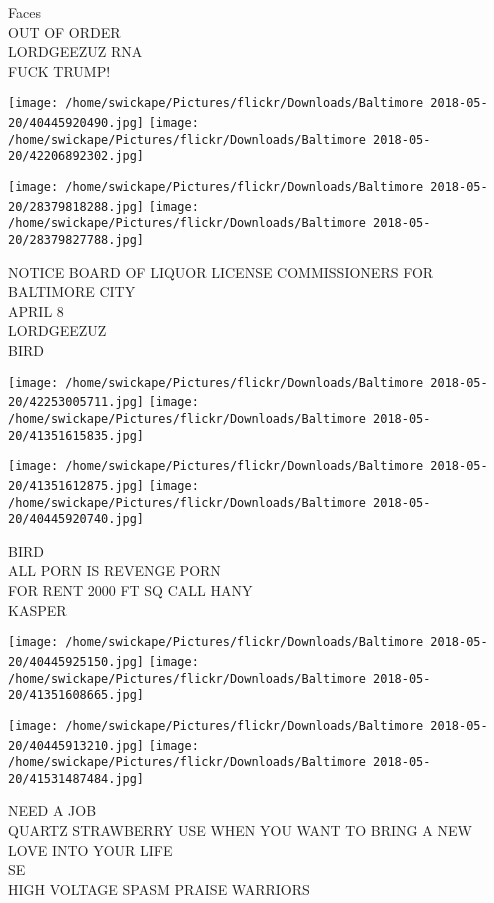 \documentclass[10pt,letterpaper]{article}
\begin{document}
Faces\\
OUT OF ORDER\\
LORDGEEZUZ RNA\\
FUCK TRUMP!
\pagebreak

\texttt{[image: /home/swickape/Pictures/flickr/Downloads/Baltimore 2018-05-20/40445920490.jpg]}
\texttt{[image: /home/swickape/Pictures/flickr/Downloads/Baltimore 2018-05-20/42206892302.jpg]}

\texttt{[image: /home/swickape/Pictures/flickr/Downloads/Baltimore 2018-05-20/28379818288.jpg]}
\texttt{[image: /home/swickape/Pictures/flickr/Downloads/Baltimore 2018-05-20/28379827788.jpg]}

NOTICE BOARD OF LIQUOR LICENSE COMMISSIONERS FOR BALTIMORE CITY\\
APRIL 8\\
LORDGEEZUZ\\
BIRD
\pagebreak

\texttt{[image: /home/swickape/Pictures/flickr/Downloads/Baltimore 2018-05-20/42253005711.jpg]}
\texttt{[image: /home/swickape/Pictures/flickr/Downloads/Baltimore 2018-05-20/41351615835.jpg]}

\texttt{[image: /home/swickape/Pictures/flickr/Downloads/Baltimore 2018-05-20/41351612875.jpg]}
\texttt{[image: /home/swickape/Pictures/flickr/Downloads/Baltimore 2018-05-20/40445920740.jpg]}

BIRD\\
ALL PORN IS REVENGE PORN\\
FOR RENT 2000 FT SQ CALL HANY\\
KASPER
\pagebreak

\texttt{[image: /home/swickape/Pictures/flickr/Downloads/Baltimore 2018-05-20/40445925150.jpg]}
\texttt{[image: /home/swickape/Pictures/flickr/Downloads/Baltimore 2018-05-20/41351608665.jpg]}

\texttt{[image: /home/swickape/Pictures/flickr/Downloads/Baltimore 2018-05-20/40445913210.jpg]}
\texttt{[image: /home/swickape/Pictures/flickr/Downloads/Baltimore 2018-05-20/41531487484.jpg]}

NEED A JOB\\
QUARTZ STRAWBERRY USE WHEN YOU WANT TO BRING A NEW LOVE INTO YOUR LIFE\\
SE\\
HIGH VOLTAGE SPASM PRAISE WARRIORS
\pagebreak
\end{document}
